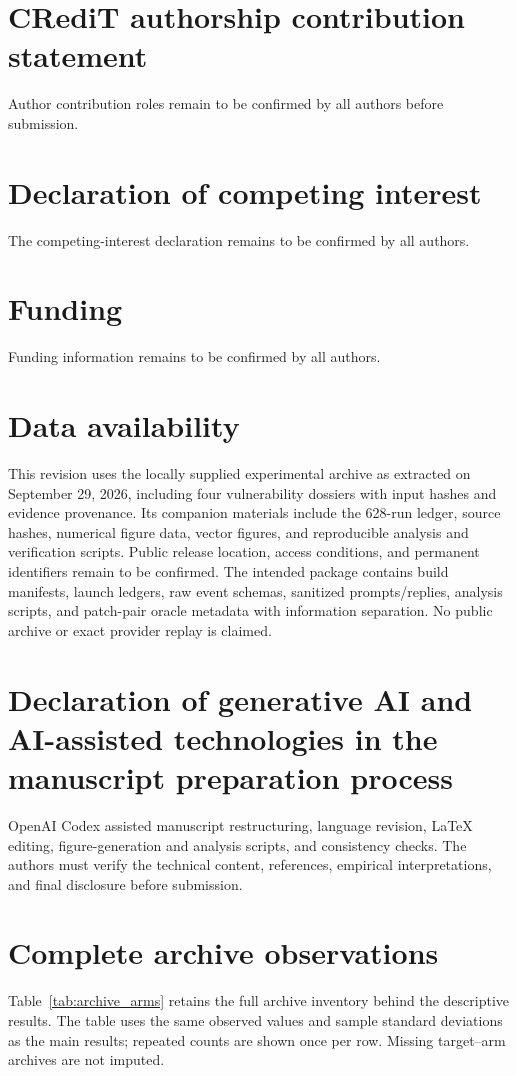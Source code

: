 \documentclass[final,5p,times,number]{elsarticle}
\begin{document}
\section*{CRediT authorship contribution statement}
Author contribution roles remain to be confirmed by all authors before submission.
\section*{Declaration of competing interest}
The competing-interest declaration remains to be confirmed by all authors.
\section*{Funding}
Funding information remains to be confirmed by all authors.
\section*{Data availability}
This revision uses the locally supplied experimental archive as extracted on September 29, 2026, including four vulnerability dossiers with input hashes and evidence provenance. Its companion materials include the 628-run ledger, source hashes, numerical figure data, vector figures, and reproducible analysis and verification scripts. Public release location, access conditions, and permanent identifiers remain to be confirmed. The intended package contains build manifests, launch ledgers, raw event schemas, sanitized prompts/replies, analysis scripts, and patch-pair oracle metadata with information separation. No public archive or exact provider replay is claimed.
\section*{Declaration of generative AI and AI-assisted technologies in the manuscript preparation process}
OpenAI Codex assisted manuscript restructuring, language revision, LaTeX editing, figure-generation and analysis scripts, and consistency checks. The authors must verify the technical content, references, empirical interpretations, and final disclosure before submission.

\appendix
\setcounter{table}{0}
\renewcommand{\theHtable}{appendix.\Alph{section}.\arabic{table}}
\section{Complete archive observations}
\label{sec:archive_appendix}
Table~\ref{tab:archive_arms} retains the full archive inventory behind the descriptive results. The table uses the same observed values and sample standard deviations as the main results; repeated counts are shown once per row. Missing target--arm archives are not imputed.




\end{document}
